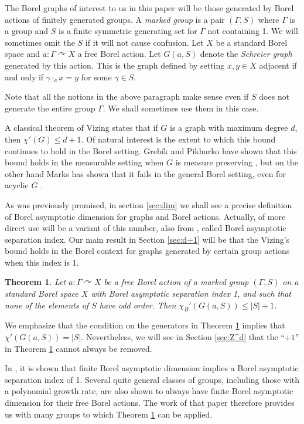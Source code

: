 \documentclass[10pt,a4paper]{article}
\newcommand{\0}{\varnothing}
\newtheorem{theorem}{Theorem}
\begin{document}
The Borel graphs of interest to us in this paper will be those generated by Borel actions of finitely generated groups. A \textit{marked group} is a pair $(\Gamma,S)$ where $\Gamma$ is a group and $S$ is a finite symmetric generating set for $\Gamma$ not containing 1. We will sometimes omit the $S$ if it will not cause confusion. Let $X$ be a standard Borel space and $a:\Gamma \curvearrowright X$ a free Borel action. Let $G(a,S)$ denote the \textit{Schreier graph} generated by this action. This is the graph defined by setting $x,y \in X$ adjacent if and only if $\gamma \cdot_a x = y$ for some $\gamma \in S$.

Note that all the notions in the above paragraph make sense even if $S$ does not generate the entire group $\Gamma$. We shall sometimes use them in this case.

A classical theorem of Vizing states that if $G$ is a graph with maximum degree $d$, then $\chi'(G) \leq d+1$. Of natural interest is the extent to which this bound continues to hold in the Borel setting. Greb\'{i}k and Pikhurko have shown that this bound holds in the measurable setting when $G$ is measure preserving \cite{GP}, but on the other hand Marks has shown that it fails in the general Borel setting, even for acyclic $G$ \cite{M15}.

As was previously promised, in section \ref{sec:dim} we shall see a precise definition of Borel asymptotic dimension for graphs and Borel actions. Actually, of more direct use will be a variant of this number, also from \cite{dim}, called Borel asymptotic separation index. Our main result in Section \ref{sec:d+1} will be that the Vizing's bound holds in the Borel context for graphs generated by certain group actions when this index is 1.

\begin{theorem}\label{th:d+1}
Let $a:\Gamma \curvearrowright X$ be a free Borel action of a marked group $(\Gamma,S)$ on a standard Borel space $X$ with Borel asymptotic separation index 1, and such that none of the elements of $S$ have odd order. Then $\chi_{B}'(G(a,S)) \leq |S|+1$.
\end{theorem}

We emphasize that the condition on the generators in Theorem \ref{th:d+1} implies that $\chi'(G(a,S)) = |S|$. Nevertheless, we will see in Section \ref{sec:Z^d} that the ``$+1$'' in Theorem \ref{th:d+1} cannot always be removed.

In \cite{dim}, it is shown that finite Borel asymptotic dimension implies a Borel asymptotic separation index of 1. Several quite general classes of groups, including those with a polynomial growth rate, are also shown to always have finite Borel asymptotic dimension for their free Borel actions. The work of that paper therefore provides us with many groups to which Theorem \ref{th:d+1} can be applied.
\end{document}
